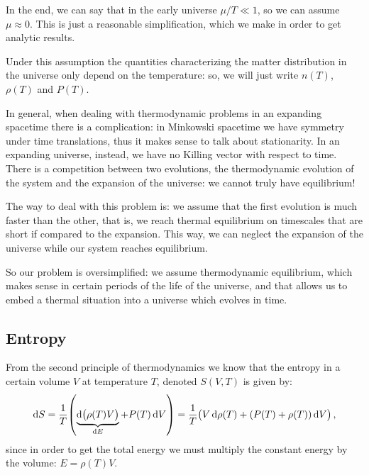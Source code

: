 \documentclass[main.tex]{subfiles}
\begin{document}
In the end, we can say that in the early universe \(\mu / T \ll 1\), so we can assume \(\mu \approx 0\).
This is just a reasonable simplification, which we make in order to get analytic results. 

Under this assumption the quantities characterizing the matter distribution in the universe only depend on the temperature: so, we will just write \(n(T)\), \(\rho (T)\) and \(P(T)\).


In general, when dealing with thermodynamic problems in an expanding spacetime there is a complication: in Minkowski spacetime we have symmetry under time translations, thus it makes sense to talk about stationarity.
In an expanding universe, instead, we have no Killing vector with respect to time.
There is a competition between two evolutions, the thermodynamic evolution of the system and the expansion of the universe: we cannot truly have equilibrium!

The way to deal with this problem is: we assume that the first evolution is much faster than the other, that is, we reach thermal equilibrium on timescales that are short if compared to the expansion.
This way, we can neglect the expansion of the universe while our system reaches equilibrium.

So our problem is oversimplified: we assume thermodynamic equilibrium, which makes sense in certain periods of the life of the universe, and that allows us to embed a thermal situation into a universe which evolves in time.


\subsection{Entropy}

From the second principle of thermodynamics we know that the entropy in a certain volume \(V\) at temperature \(T\), denoted \(S(V, T)\) is given by: 
%
\begin{equation} \label{eq:entropy-differential-definition}
  \dd{S}  = \frac{1}{T} \qty(\underbrace{\dd{\qty(\rho(T) V)}}_{ \dd{E}}  + P(T) \dd{V})
  = \frac{1}{T} \qty(V \dd{\rho (T)} + (P(T) + \rho(T) ) \dd{V})
\,,
\end{equation}
%
since in order to get the total energy we must multiply the constant energy by the volume: \(E = \rho (T) V\). 
 
\end{document}

